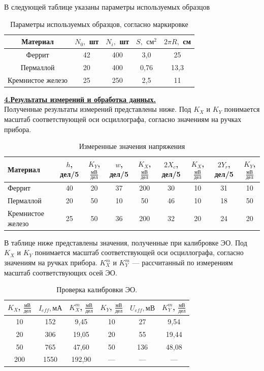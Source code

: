 \documentclass[12pt, letterpaper, oneside]{article}
\begin{document}
В следующей таблице указаны параметры используемых образцов\\
\begin{table}[H]
\centering
\caption{Параметры используемых образцов, согласно маркировке}
\begin{tabular}{|c|c|c|c|c|}
\hline
Материал & $N_0,$ шт & $N_i,$ шт & $S,$ $см^2$ & $2\pi R,$ см\\
\hline
Феррит & 42 & 400 & 3,0 & 25\\
\hline
Пермаллой & 20 & 400 & 0,76 & 13,3\\
\hline
Кремнистое железо & 25 & 250 & 2,5 & 11\\
\hline
\end{tabular}
\end{table}
\noindent\textbf{\underline{4.Результаты измерений и обработка данных.}}\\
Полученные результаты измерений представлены ниже. Под $K_X$ и $K_Y$ понимается масштаб соответствующей оси осциллографа, согласно значениям на ручках прибора.
\begin{table}[H]\label{raw_data}
\centering
\caption{Измеренные значения напряжения}
\begin{tabular}{|m{2.1cm}|c|c||c|c||c|c||c|c|}
\hline
Материал & $h$, дел/5 & $K_Y$, $\frac{мВ}{дел}$ & $w$, дел/5 & $K_X$, $\frac{мВ}{дел}$ & $2X_c$, дел/5 & $K_X$, $\frac{мВ}{дел}$ & $2Y_r$, дел/5 & $K_Y$, $\frac{мВ}{дел}$\\
\hline
Феррит & 40 & 20 & 37 & 200 & 30 & 10 & 31 & 10\\
\hline
Пермаллой & 20 & 50 & 10 & 50 & 46 & 10 & 18 & 50\\
\hline
Кремнистое железо & 25 & 50 & 36 & 200 & 32 & 20 & 24 & 20\\
\hline
\end{tabular}
\end{table}\noindent
В таблице ниже представлены значения, полученные при калибровке ЭО. Под $K_X$ и $K_Y$ понимается масштаб соответствующей оси осциллографа, согласно значениям на ручках прибора. $K_X^m$ и $K_Y^m$ — рассчитанный по измерениям масштаб соответствующих осей ЭО.
\begin{table}[H]
\centering
\caption{Проверка калибровки ЭО.}
\begin{tabular}{|c|c|c||c|c|c|}
\hline
$K_X$, $\frac{мВ}{дел}$ & $I_{eff}, мА$ & $K_X^m$, $\frac{мВ}{дел}$ & $K_Y$, $\frac{мВ}{дел}$ & $U_{eff}, мВ$ & $K_Y^m$, $\frac{мВ}{дел}$\\
\hline
10 & 152 & 9,45 & 10 & 27 & 9,54\\
\hline
20 & 306 & 19,05 & 20 & 55 & 19,44\\
\hline
50 & 765 & 47,60 & 50 & 136 & 48,08\\
\hline
200 & 1550 & 192,90 & — & — & —\\
\hline
\end{tabular}
\end{table}\noindent
\end{document}
